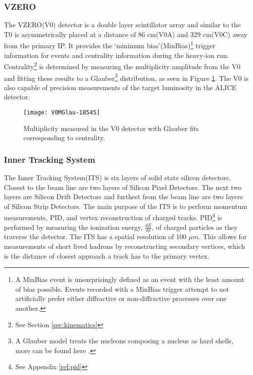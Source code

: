 \subsubsection{VZERO}
The VZERO(V0)\cite{Abbas:2013taa} detector is a double layer scintillator array and similar to the T0 is asymmetrically placed at a distance of 86 cm(V0A) and 329 cm(V0C) away from the primary IP.  It provides the `minimum bias'(MinBias)\footnote{A MinBias event is unsurprisingly defined as an event with the least amount of bias possible.  Events recorded with a MinBias trigger  attempt to not artificially prefer either diffractive or non-diffractive processes over one another\cite{Field:2011iq}.} trigger information for events and centrality information during the heavy-ion run.   Centrality\footnote{See Section \ref{sec:kinematics}} is determined by measuring the multiplicity amplitude from the V0 and fitting these results to a Glauber\footnote{A Glauber model treats the nucleons composing a nucleus as hard shells, more can be found here \cite{Loizides:2016djv}.} distribution, as seen in Figure \ref{fig:ITSGLAUBERFIT}.  The V0 is also capable of precision measurements of the target luminosity in the ALICE detector.

\begin{figure}[h!]
\texttt{[image: V0MGlau-18545]}
\centering
\caption{Multiplicity measured in the V0 detector with Glauber fits corresponding to centrality\cite{Adam:2015ptt}.}
 \label{fig:ITSGLAUBERFIT}
\end{figure}

\subsubsection{Inner Tracking System}\label{sec:its}
The Inner Tracking System(ITS)\cite{BEOLE20121062} is six layers of solid state silicon detectors.  Closest to the beam line are two layers of Silicon Pixel Detectors.  The next two layers are Silicon Drift Detectors and furthest from the beam line are two layers of Silicon Strip Detectors.  The main purpose of the ITS is to perform momentum measurements, PID, and vertex reconstruction of charged tracks.  PID\footnote{See Appendix \ref{ref:pid}} is performed by measuring the ionization energy, $\frac{dE}{dx}$, of charged particles as they traverse the detector\cite{Adam:2016acv}.  The ITS has a spatial resolution of 100 $\mu m$.  This allows for measurements of short lived hadrons by reconstructing secondary vertices, which is the distance of closest approach a track has to the primary vertex.


